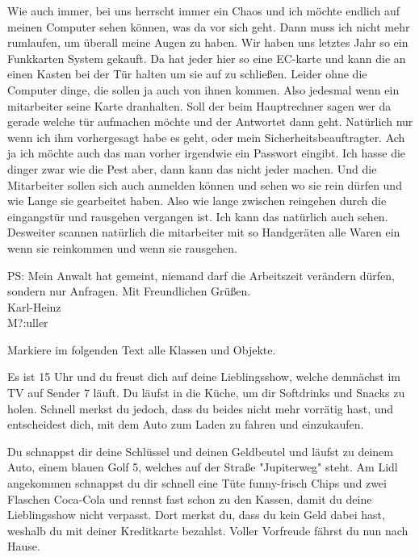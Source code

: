         Wie auch immer, bei uns herrscht immer ein Chaos und ich möchte endlich auf meinen Computer sehen können, was da vor sich geht. Dann muss ich nicht mehr rumlaufen, um überall meine Augen zu haben.
        Wir haben uns letztes Jahr so ein Funkkarten System gekauft. Da hat jeder hier so eine EC-karte und kann die an einen Kasten bei der Tür halten um sie auf zu schließen. Leider ohne die Computer dinge, die sollen ja auch von ihnen kommen. Also jedesmal wenn ein mitarbeiter seine Karte dranhalten. Soll der beim Hauptrechner sagen wer da gerade welche tür aufmachen möchte und der Antwortet dann geht. Natürlich nur wenn ich ihm vorhergesagt habe es geht, oder mein Sicherheitsbeauftragter. Ach ja ich möchte auch das man vorher irgendwie ein Passwort eingibt. Ich hasse die dinger zwar wie die Pest aber, dann kann das nicht jeder machen.
        Und die Mitarbeiter sollen sich auch anmelden können und sehen wo sie rein dürfen und wie Lange sie gearbeitet haben. Also wie lange zwischen reingehen durch die eingangstür und rausgehen vergangen ist. Ich kann das natürlich auch sehen.\\
        Desweiter scannen natürlich die mitarbeiter mit so Handgeräten alle Waren ein wenn sie reinkommen und wenn sie rausgehen.
        \medskip

        PS: Mein Anwalt hat gemeint, niemand darf die Arbeitszeit verändern dürfen, sondern nur Anfragen.
        \medskip
        Mit Freundlichen Grüßen.\\Karl-Heinz\\ M?:uller

        \subexcercise
        Markiere im folgenden Text alle Klassen und Objekte.

        Es ist 15 Uhr und du freust dich auf deine Lieblingsshow, welche demnächst im TV auf Sender 7 läuft.
        Du läufst in die Küche, um dir Softdrinks und Snacks zu holen. Schnell merkst du jedoch, dass du beides nicht mehr vorrätig hast, und entscheidest dich, mit dem Auto zum Laden zu fahren und einzukaufen.

        Du schnappst dir deine Schlüssel und deinen Geldbeutel und läufst zu deinem Auto, einem blauen Golf 5, welches auf der Straße "Jupiterweg" steht.
        Am Lidl angekommen schnappst du dir schnell eine Tüte funny-frisch Chips und zwei Flaschen Coca-Cola und rennst fast schon zu den Kassen, damit du deine Lieblingsshow nicht verpasst. Dort merkst du, dass du kein Geld dabei hast, weshalb du mit deiner Kreditkarte bezahlst. Voller Vorfreude fährst du nun nach Hause.
